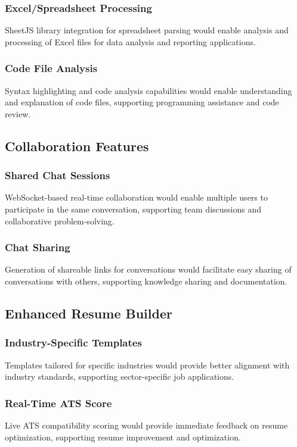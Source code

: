 \documentclass[conference]{IEEEtran}
\begin{document}
\subsubsection{Excel/Spreadsheet Processing}
SheetJS library integration for spreadsheet parsing would enable analysis and processing of Excel files for data analysis and reporting applications.

\subsubsection{Code File Analysis}
Syntax highlighting and code analysis capabilities would enable understanding and explanation of code files, supporting programming assistance and code review.

\subsection{Collaboration Features}

\subsubsection{Shared Chat Sessions}
WebSocket-based real-time collaboration would enable multiple users to participate in the same conversation, supporting team discussions and collaborative problem-solving.

\subsubsection{Chat Sharing}
Generation of shareable links for conversations would facilitate easy sharing of conversations with others, supporting knowledge sharing and documentation.

\subsection{Enhanced Resume Builder}

\subsubsection{Industry-Specific Templates}
Templates tailored for specific industries would provide better alignment with industry standards, supporting sector-specific job applications.

\subsubsection{Real-Time ATS Score}
Live ATS compatibility scoring would provide immediate feedback on resume optimization, supporting resume improvement and optimization.
\end{document}
